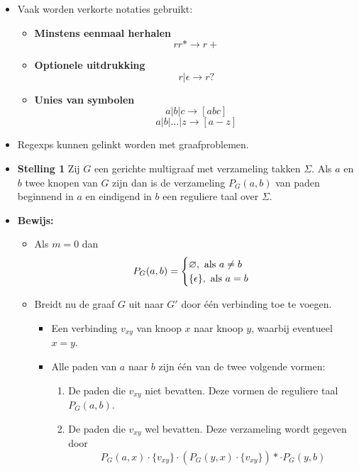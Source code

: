 \begin{itemize}
\begin{table}[ht]
    \end{table}
    \item Vaak worden verkorte notaties gebruikt:
    \begin{itemize}
        \item \textbf{Minstens eenmaal herhalen}
        $$rr* \rightarrow r+$$
        \item \textbf{Optionele uitdrukking}
        $$r|\epsilon \rightarrow r?$$
        
        \item \textbf{Unies van symbolen}
        $$a|b|c \rightarrow [abc] $$
        $$a|b|\dots|z \rightarrow [a-z] $$

        
    \end{itemize}

    \item Regexps kunnen gelinkt worden met graafproblemen.
    \item \textbf{Stelling 1} Zij $G$ een gerichte multigraaf met verzameling takken $\Sigma$. Als $a$ en $b$ twee knopen van $G$ zijn dan is de verzameling $P_G(a, b)$ van paden beginnend in $a$ en eindigend in $b$ een reguliere taal over $\Sigma$.
    \item \textbf{Bewijs:}
    \begin{itemize}
        Via inductie op het aantal verbindingen $m$ van $G$.
        \item Als $m = 0$ dan
        $$P_G(a, b) = \begin{cases}
            \varnothing, \hbox{ als } a \neq b\\
            \{\epsilon\}, \hbox{ als } a = b 
        \end{cases}$$
        \item Breidt nu de graaf $G$ uit naar $G'$ door één verbinding toe te voegen.
        \begin{itemize}
            \item Een verbinding $v_{xy}$ van knoop $x$ naar knoop $y$, waarbij eventueel $x = y$.
            \item Alle paden van $a$ naar $b$ zijn één van de twee volgende vormen:
            \begin{enumerate}
                \item De paden die $v_{xy}$ niet bevatten. Deze vormen de reguliere taal $P_G(a, b)$.
                \item De paden die $v_{xy}$ wel bevatten. Deze verzameling wordt gegeven door
                $$P_G(a, x) \cdot \{v_{xy}\} \cdot (P_G(y, x) \cdot \{v_{xy}\})* \cdot P_G(y, b)$$


\end{enumerate}
\end{itemize}
\end{itemize}
\end{itemize}
